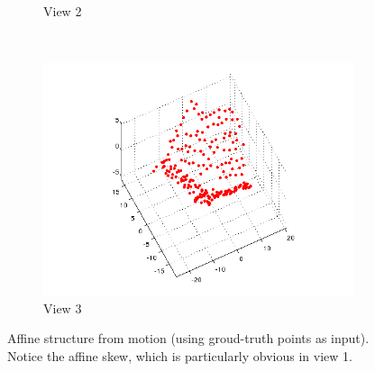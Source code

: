 \documentclass[a4paper,10pt]{article}
\begin{document}
\begin{figure}[h!tb]
\begin{subfigure}{0.3\textwidth}
                \caption{View 2}
        \end{subfigure}
        ~
        \begin{subfigure}{0.3\textwidth}
                \centering
                \includegraphics[width=\textwidth]{AffineStructure3}
                \caption{View 3}
        \end{subfigure}
\caption{Affine structure from motion (using groud-truth points as input). Notice the affine skew, which is particularly obvious in view 1.}
\label{fig:affine}      
\end{figure}
\end{document}
